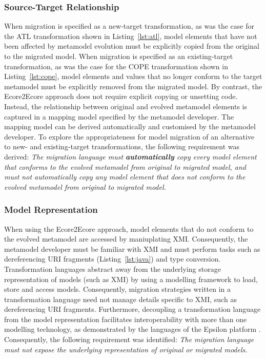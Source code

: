 \subsubsection{Source-Target Relationship}
When migration is specified as a new-target transformation, as was the case for the ATL transformation shown in Listing~\ref{lst:atl}, model elements that have not been affected by metamodel evolution must be explicitly copied from the original to the migrated model. When migration is specified as an existing-target transformation, as was the case for the COPE transformation shown in Listing~\ref{lst:cope}, model elements and values that no longer conform to the target metamodel must be explicitly removed from the migrated model. By contrast, the Ecore2Ecore approach does not require explicit copying or unsetting code. Instead, the relationship between original and evolved metamodel elements is captured in a mapping model specified by the metamodel developer. The mapping model can be derived automatically and customised by the metamodel developer. To explore the appropriateness for model migration of an alternative to new- and existing-target transformations, the following requirement was derived: \emph{The migration language must \textbf{automatically} copy every model element that conforms to the evolved metamodel from original to migrated model, and must not automatically copy any model element that does not conform to the evolved metamodel from original to migrated model.}


\subsubsection{Model Representation}
When using the Ecore2Ecore approach, model elements that do not conform to the evolved metamodel are accessed by maniuplating XMI. Consequently, the metamodel developer must be familiar with XMI and must perform tasks such as dereferencing URI fragments (Listing~\ref{lst:java}) and type conversion. Transformation languages abstract away from the underlying storage representation of models (such as XMI) by using a modelling framework to load, store and access models. Consequently, migration strategies written in a transformation language need not manage details specific to XMI, such as dereferencing URI fragments. Furthermore, decoupling a transformation language from the model representation facilitates interoperability with more than one modelling technology, as demonstrated by the languages of the Epsilon platform \cite{kolovos09thesis}. Consequently, the following requirement was identified: \emph{The migration language must not expose the underlying representation of original or migrated models.}

